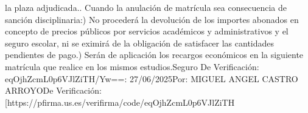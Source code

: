 \documentclass{article}
\begin{document}
\begin{itemize}
la plaza adjudicada.\n{}. Cuando la anulación de matrícula sea consecuencia de sanción disciplinaria:\n\na) No procederá la devolución de los importes abonados en concepto de precios públicos por servicios académicos y administrativos y el seguro escolar, ni se eximirá de la obligación de satisfacer las cantidades pendientes de pago.\n\nb) Serán de aplicación los recargos económicos en la siguiente matrícula que realice en los mismos estudios.\n{} Seguro De Verificación: eqOjhZcmL0p6VJlZiTH/Yw==\nFecha: 27/06/2025\nFirmado Por: MIGUEL ANGEL CASTRO ARROYO\nUrl De Verificación: [https://pfirma.us.es/verifirma/code/eqOjhZcmL0p6VJlZiTH%
\end{itemize}
\end{document}
